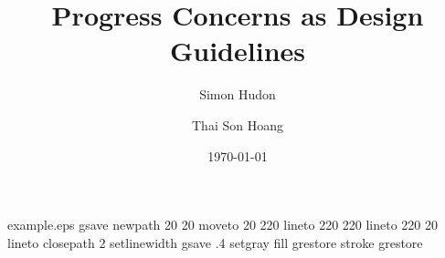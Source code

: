 %
%
%
%
%
\begin{filecontents*}{example.eps}
gsave
newpath
  20 20 moveto
  20 220 lineto
  220 220 lineto
  220 20 lineto
closepath
2 setlinewidth
gsave
  .4 setgray fill
grestore
stroke
grestore
\end{filecontents*}
%
\RequirePackage{fix-cm}
%
\documentclass[smallextended]{svjour3}       %
%
\smartqed  %
%
\usepackage{graphicx}
%
%
%
%
%
\author{Simon Hudon \and Thai Son Hoang}

\title{Progress Concerns as Design Guidelines}
\date{\today}

\newtheorem{Definition}[def]{Definition}
\newcommand{\Defn}{Definition}
\newtheorem{Postulate}[ptl]{Postulate}
\newcommand{\Post}{Postulate}
\newtheorem{Example}[exp]{Example}
\newcommand{\Exmp}{Example}
\newtheorem{Theorem}[thm]{Theorem}
\newcommand{\Thm}{Theorem}


